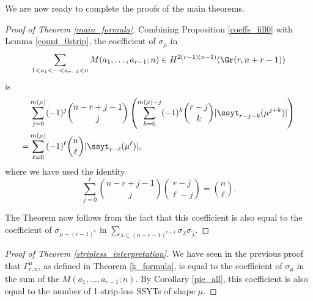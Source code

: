 We are now ready to complete the proofs of the main theorems.

\begin{proof}[Proof of Theorem \ref{main_formula}]
Combining Proposition \ref{coeffs_fill0} with Lemma \ref{count_0strip}, the coefficient of $\sigma_\mu$ in 
\begin{equation*}
\sum_{1<a_1<\cdots<a_{r-1}<n}M(a_1,\ldots,a_{r-1};n)\in H^{2(r-1)(n-1)}(\Gr(r,n+r-1))
\end{equation*}
is 
\begin{align*}
&\sum_{j=0}^{m(\mu)}(-1)^j\binom{n-r+j-1}{j}\left(\sum_{k=0}^{m(\mu)-j}(-1)^k\binom{r-j}{k}|\ssyt_{r-j-k}(\mu^{j+k})|\right)\\
=&\sum_{\ell=0}^{m(\mu)}(-1)^{\ell}\binom{n}{\ell}|\ssyt_{r-\ell}(\mu^\ell)|,
\end{align*}
where we have used the identity
\begin{equation*}
\sum_{j=0}^{\ell}\binom{n-r+j-1}{j}\binom{r-j}{\ell-j}=\binom{n}{\ell}.
\end{equation*}

The Theorem now follows from the fact that this coefficient is also equal to the coefficient of $\sigma_{\mu-(r-1)^r}$ in $\sum_{\lambda\subset(n-r-1)^{r-1}}\sigma_{\lambda}\sigma_{\widetilde{\lambda}}$.
\end{proof}

\begin{proof}[Proof of Theorem \ref{stripless_interpretation}]
We have seen in the previous proof that $\Gamma^\mu_{r,n}$, as defined in Theorem \ref{k_formula}, is equal to the coefficient of $\sigma_\mu$ in the sum of the $M(a_1,\ldots,a_{r-1};n)$. By Corollary \ref{pie_all}, this coefficient is also equal to the number of 1-strip-less SSYTs of shape $\mu$.
\end{proof}

